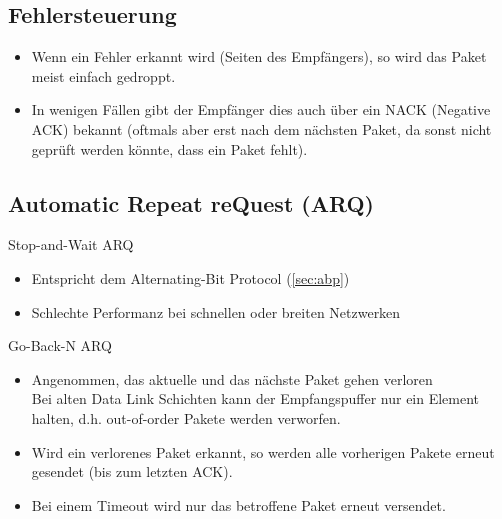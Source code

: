 		\subsection{Fehlersteuerung}

			\begin{itemize}
				\item Wenn ein Fehler erkannt wird (Seiten des Empfängers), so wird das Paket meist einfach gedroppt.
				\item In wenigen Fällen gibt der Empfänger dies auch über ein NACK (Negative ACK) bekannt (oftmals aber erst nach dem nächsten Paket, da sonst nicht geprüft werden könnte, dass ein Paket fehlt).
			\end{itemize}

		\subsection{Automatic Repeat reQuest (ARQ)}
			\begin{description}[leftmargin = 2cm]
				\item[ARQ Typ 1] Stop-and-Wait ARQ
					\begin{itemize}
						\item Entspricht dem Alternating-Bit Protocol (\ref{sec:abp})
						\item Schlechte Performanz bei schnellen oder breiten Netzwerken
					\end{itemize}
				\item[ARQ Typ 2] Go-Back-N ARQ
					\begin{itemize}
						\item Angenommen, das aktuelle und das nächste Paket gehen verloren \\ Bei alten Data Link Schichten kann der Empfangspuffer nur ein Element halten, d.h. out-of-order Pakete werden verworfen.
						\item Wird ein verlorenes Paket erkannt, so werden alle vorherigen Pakete erneut gesendet (bis zum letzten ACK).
						\item Bei einem Timeout wird nur das betroffene Paket erneut versendet.
					\end{itemize}
			\end{description}

